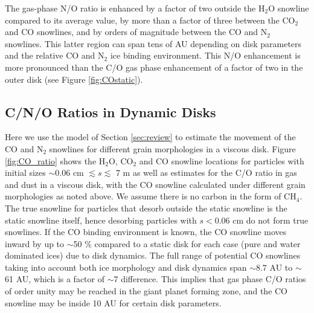 \documentclass[apj]{emulateapj}
\begin{document}
The gas-phase N/O ratio is enhanced by a factor of two outside the H$_2$O snowline compared to its average value, by more than a factor of three between the CO$_2$ and CO snowlines, and by orders of magnitude between the CO and N$_2$ snowlines. This latter region can span tens of AU depending on disk parameters and the relative CO and N$_2$ ice binding environment. This N/O  enhancement is more pronounced than the C/O gas phase enhancement of a factor of two in the outer disk (see Figure \ref{fig:COstatic}). %

\subsection{C/N/O Ratios in Dynamic Disks}
\label{sec:dynamic}



Here we use the model of Section \ref{sec:review} to estimate the movement of the CO and N$_2$ snowlines for different grain morphologies in a viscous disk. Figure \ref{fig:CO_ratio} shows the H$_2$O, CO$_2$ and CO snowline locations for particles with initial sizes $\sim0.06$ cm $\lesssim s \lesssim$ 7 m as well as estimates for the C/O ratio in gas and dust in a viscous disk, with the CO snowline calculated under different grain morphologies as noted above. We assume there is no carbon in the form of CH$_4$. The true snowline for particles that desorb outside the static snowline is the static snowline itself, hence desorbing particles with $s<0.06$ cm do not form true snowlines. If the CO binding environment is known, the CO snowline moves inward by up to $\sim$50 \% compared to a static disk for each case (pure and water dominated ices) due to disk dynamics. The full range of potential CO snowlines taking into account both ice morphology and disk dynamics span $\sim$8.7 AU to $\sim$61 AU, which is a factor of $\sim$7 difference. This implies that gas phase C/O ratios of order unity may be reached in the giant planet forming zone, and the CO snowline may be inside 10 AU for certain disk parameters.  
\end{document}
